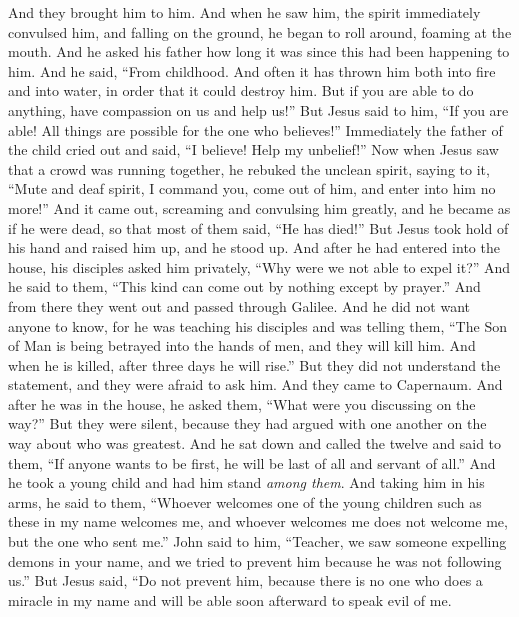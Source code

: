 \begin{biblechapter}
\verse And they brought him to him. And when he saw him, the spirit immediately convulsed him, and falling on the ground, he began to roll around, foaming at the mouth.
\verse And he asked his father how long it was since this had been happening to him. And he said, “From childhood.
\verse And often it has thrown him both into fire and into water, in order that it could destroy him. But if you are able to do anything, have compassion on us and help us!”
\verse But Jesus said to him, “If you are able! All things are possible for the one who believes!”
\verse Immediately the father of the child cried out and said, “I believe! Help my unbelief!”
\verse Now when Jesus saw that a crowd was running together, he rebuked the unclean spirit, saying to it, “Mute and deaf spirit, I command you, come out of him, and enter into him no more!”
\verse And it came out, screaming and convulsing him greatly, and he became as if he were dead, so that most of them said, “He has died!”
\verse But Jesus took hold of his hand and raised him up, and he stood up.
\verse And after he had entered into the house, his disciples asked him privately, “Why were we not able to expel it?”
\verse And he said to them, “This kind can come out by nothing except by prayer.”
 And from there they went out and passed through Galilee. And he did not want anyone to know,
\verse for he was teaching his disciples and was telling them, “The Son of Man is being betrayed into the hands of men, and they will kill him. And when he is killed, after three days he will rise.”
\verse But they did not understand the statement, and they were afraid to ask him.
 And they came to Capernaum. And after he was in the house, he asked them, “What were you discussing on the way?”
\verse But they were silent, because they had argued with one another on the way about who was greatest.
\verse And he sat down and called the twelve and said to them, “If anyone wants to be first, he will be last of all and servant of all.”
\verse And he took a young child and had him stand \textit{among them}. And taking him in his arms, he said to them,
\verse “Whoever welcomes one of the young children such as these in my name welcomes me, and whoever welcomes me does not welcome me, but the one who sent me.”
 John said to him, “Teacher, we saw someone expelling demons in your name, and we tried to prevent him because he was not following us.”
\verse But Jesus said, “Do not prevent him, because there is no one who does a miracle in my name and will be able soon afterward to speak evil of me.

\end{biblechapter}

